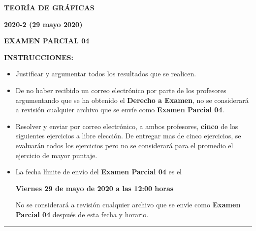 \documentclass[12pt]{report}
\begin{document}
\begin{center}
\textbf{\LARGE {TEORÍA DE GRÁFICAS}}
\end{center}

\begin{center}
\textbf{{\large 2020-2 (29 mayo 2020)}}
\end{center}

\begin{center}
\textbf{{\large EXAMEN PARCIAL 04}}
\end{center}

{\bf INSTRUCCIONES:}
\begin{itemize}
\item Justificar y argumentar todos los resultados que se realicen.

\item De no haber recibido un correo electrónico por parte de los profesores argumentando que se ha obtenido el \textbf{Derecho a Examen}, no se considerará a revisión cualquier archivo que se envíe como \textbf{Examen Parcial 04}.

\item Resolver y enviar por correo electrónico, a ambos profesores, \textbf{cinco} de los siguientes ejercicios a libre elección. De entregar mas de cinco ejercicios, se evaluarán todos los ejercicios pero no se considerará para el promedio el ejercicio de mayor puntaje.

\item La fecha límite de envío del \textbf{Examen Parcial 04} es el
\begin{center}
\textbf{Viernes 29 de mayo de 2020 a las 12:00 horas}
\end{center}
No se considerará a revisión cualquier archivo que se envíe como \textbf{Examen Parcial 04} después de esta fecha y horario.

\end{itemize}

\begin{center}
\rule[0mm]{20cm}{0.2mm}
\end{center}
\end{document}
